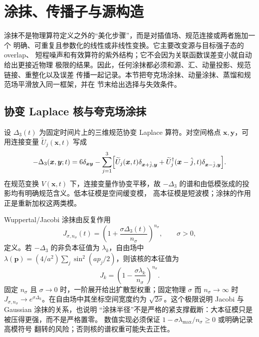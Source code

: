 \chapter{涂抹、传播子与源构造}
\label{sec:b03-smearing-source}

涂抹不是物理算符定义之外的“美化步骤”，而是对插值场、规范连接或两者施加一个
明确、可重复且参数化的线性或非线性变换。它主要改变源与目标强子态的 overlap、
短程噪声和有效算符的紫外结构；它不会因为关联函数误差变小就自动给出更接近物理
极限的结果。因此，任何涂抹都必须和源、汇、动量投影、规范链接、重整化以及误差
传播一起记录。本节把夸克场涂抹、动量涂抹、蒸馏和规范场平滑放入同一框架，并在
节末给出选择与失效条件。

\section{协变 Laplace 核与夸克场涂抹}

设 \(\Delta_3(t)\) 为固定时间片上的三维规范协变 Laplace 算符。对空间格点
\(\boldsymbol{x},\boldsymbol{y}\)，可用连接变量
\(\widetilde U_j(\boldsymbol{x},t)\) 写成
\begin{equation}
  -\Delta_3(\boldsymbol{x},\boldsymbol{y};t)
  =6\delta_{\boldsymbol{x}\boldsymbol{y}}
  -\sum_{j=1}^{3}\Bigl[
  \widetilde U_j(\boldsymbol{x},t)\delta_{\boldsymbol{x}+\hat j,\boldsymbol{y}}
  +\widetilde U_j^\dagger(\boldsymbol{x}-\hat j,t)
  \delta_{\boldsymbol{x}-\hat j,\boldsymbol{y}}\Bigr].
  \label{eq:b03-laplace}
\end{equation}
在规范变换 \(V(\boldsymbol{x},t)\) 下，连接变量作协变平移，故
\(-\Delta_3\) 的谱和由低模张成的投影均有明确规范含义。低本征模是空间缓变模，
高本征模是短波模；涂抹的作用正是重新加权这两类模。

Wuppertal/Jacobi 涂抹由反复作用
\begin{equation}
  J_{\sigma,n_\sigma}(t)
  =\left(1+\frac{\sigma\Delta_3(t)}{n_\sigma}\right)^{n_\sigma},
  \qquad \sigma>0,
  \label{eq:b03-jacobi}
\end{equation}
定义。若 \(-\Delta_3\) 的非负本征值为 \(\lambda_k\)，自由场中
\(\lambda(\boldsymbol p)=(4/a^2)\sum_j\sin^2(ap_j/2)\)，则该核的本征值为
\begin{equation}
  J_k=\left(1-\frac{\sigma\lambda_k}{n_\sigma}\right)^{n_\sigma}.
  \label{eq:b03-jacobi-spectrum}
\end{equation}
固定 \(n_\sigma\) 且 \(\sigma\to0\) 时，一阶展开给出扩散型权重；固定物理
\(\sigma\) 而 \(n_\sigma\to\infty\) 时
\(J_{\sigma,n_\sigma}\to e^{\sigma\Delta_3}\)。在自由场中其坐标空间宽度约为
\(\sqrt{2\sigma}\)。这个极限说明 Jacobi 与 Gaussian 涂抹的关系，也说明
“涂抹半径”不是严格的紧支撑截断：大本征模只是被压得更强，而不是严格置零。
数值实现必须保证 \(1-\sigma\lambda_{\max}/n_\sigma\ge0\) 或明确记录高模符号
翻转的风险；否则核的谱权重可能失去正性。

